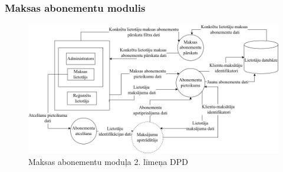 \subsubsection{Maksas abonementu modulis}

\begin{figure}[htbp]
	\centering
	\includegraphics[width=\linewidth]{./src/img/MaksasAbonementaModuls.png}
	\caption{Maksas abonementu moduļa 2. līmeņa DPD}
	\label{fig:dpd-2-premium-user}
\end{figure}





